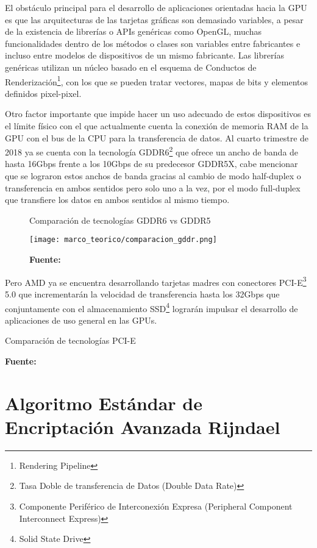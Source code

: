 \documentclass[../main/main.tex]{subfiles}
\begin{document}
  El obstáculo principal para el desarrollo de aplicaciones orientadas hacia la GPU es que las arquitecturas de las tarjetas gráficas son demasiado variables, a pesar de la existencia de librerías o APIs genéricas como OpenGL, muchas funcionalidades dentro de los métodos o clases son variables entre fabricantes e incluso entre modelos de dispositivos de un mismo fabricante. Las librerías genéricas utilizan un núcleo basado en el esquema de Conductos de Renderización\footnote{Rendering Pipeline}, con los que se pueden tratar vectores, mapas de bits y elementos definidos pixel-pixel.

  Otro factor importante que impide hacer un uso adecuado de estos dispositivos es el límite físico con el que actualmente cuenta la conexión de memoria RAM de la GPU con el bus de la CPU para la transferencia de datos. Al cuarto trimestre de 2018 ya se cuenta con la tecnología GDDR6\footnote{Tasa Doble de transferencia de Datos  (Double Data Rate)} que ofrece un ancho de banda de hasta 16Gbps frente a los 10Gbps de su predecesor GDDR5X, cabe mencionar que se lograron estos anchos de banda gracias al cambio de modo half-duplex o transferencia en ambos sentidos pero solo uno a la vez, por el modo full-duplex que transfiere los datos en ambos sentidos al mismo tiempo.

  \begin{figure}[H]
    \centering
    \caption{Comparación de tecnologías GDDR6 vs GDDR5}
    \texttt{[image: marco\_teorico/comparacion\_gddr.png]}
    \caption*{\textbf{Fuente:} \cite{web:comparacion_gddr}}
  \end{figure}

  Pero AMD ya se encuentra desarrollando tarjetas madres con conectores PCI-E\footnote{Componente Periférico de Interconexión Expresa (Peripheral Component Interconnect Express)} 5.0 que incrementarán la velocidad de transferencia hasta los 32Gbps que conjuntamente con el almacenamiento SSD\footnote{Solid State Drive} lograrán impulsar el desarrollo de aplicaciones de uso general en las GPUs.

  \begin{table}[H]
    \centering
    \caption{Comparación de tecnologías PCI-E}
    
    \caption*{\textbf{Fuente:} \cite{web:comparacion_pcie}}
  \end{table}

  \section{Algoritmo Estándar de Encriptación Avanzada Rijndael}
\end{document}

